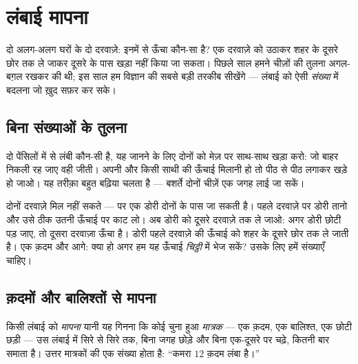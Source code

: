 \chapter{लंबाई मापना}\label{ch:g2:measuring-length}

दो अलग-अलग घरों के दो दरवाज़े: इनमें से ऊँचा कौन-सा है? एक दरवाज़े को
उठाकर शहर के दूसरे छोर तक ले जाकर दूसरे के पास खड़ा नहीं किया जा
सकता। पिछले साल हमने चीज़ों की तुलना अगल-बग़ल रखकर की थी; इस साल हम
विज्ञान की सबसे बड़ी तरकीब सीखेंगे --- लंबाई को ऐसी \emph{संख्या} में
बदलना जो ख़ुद सफ़र कर सके।

\section{बिना संख्याओं के तुलना}

\begin{example}\label{ex:g2:measuring-length:sidebyside}
दो पेंसिलों में से लंबी कौन-सी है, यह जानने के लिए दोनों को मेज़ पर
साथ-साथ खड़ा करो: जो बाहर निकली रह जाए वही जीती। अपनी और किसी साथी की
ऊँचाई मिलानी हो तो पीठ से पीठ लगाकर खड़े हो जाओ। यह तरीक़ा बहुत बढ़िया
चलता है --- बशर्ते दोनों चीज़ें एक जगह लाई जा सकें।
\end{example}

\begin{example}[डोरी वाली तरकीब]\label{ex:g2:measuring-length:string}
दोनों दरवाज़े मिल नहीं सकते --- पर एक डोरी दोनों के पास जा सकती है।
पहले दरवाज़े पर डोरी तानो और उसे ठीक उतनी ऊँचाई पर काट लो। अब डोरी को
दूसरे दरवाज़े तक ले जाओ: अगर डोरी छोटी पड़ जाए, तो दूसरा दरवाज़ा ऊँचा
है। डोरी पहले दरवाज़े की ऊँचाई को शहर के दूसरे छोर तक ले जाती है। एक
क़दम और आगे: क्या हो अगर हम यह ऊँचाई \emph{चिट्ठी} में भेज सकें? उसके
लिए हमें संख्याएँ चाहिए।
\end{example}

\section{क़दमों और बालिश्तों से मापना}

\begin{definition}[लंबाई मापना]\label{def:g2:measuring-length:measure}
किसी लंबाई को \emph{मापना} यानी यह गिनना कि कोई चुना
हुआ \emph{मात्रक} --- एक क़दम, एक बालिश्त, एक छोटी छड़ी
--- उस लंबाई में सिरे से सिरे तक, बिना जगह छोड़े और बिना एक-दूसरे पर
चढ़े, कितनी बार समाता है। उत्तर मात्रकों की एक संख्या होता है:
``कमरा $12$ क़दम लंबा है।''
\end{definition}

